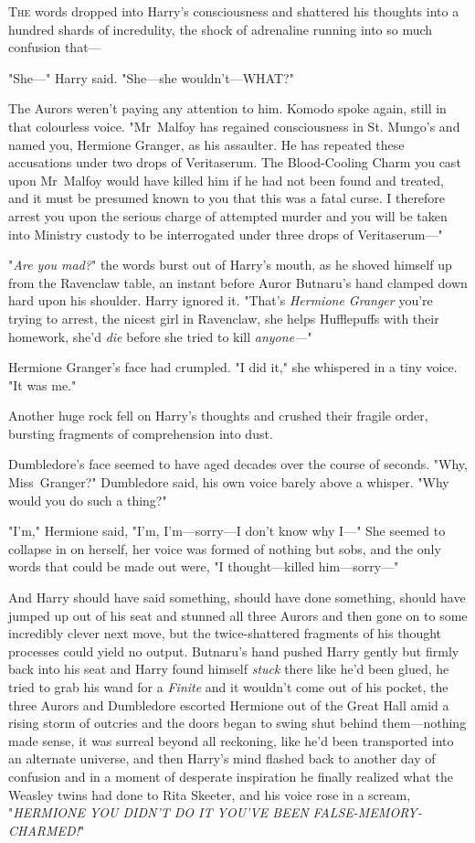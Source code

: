 
\lettrine{T}{he} words dropped into Harry's consciousness and shattered his thoughts into a
hundred shards of incredulity, the shock of adrenaline running into so much
confusion that—

"She—" Harry said. "She—she wouldn't—WHAT?"

The Aurors weren't paying any attention to him. Komodo spoke again, still in
that colourless voice. "Mr~Malfoy has regained consciousness in St. Mungo's and
named you, Hermione Granger, as his assaulter. He has repeated these
accusations under two drops of Veritaserum. The Blood-Cooling Charm you cast
upon Mr~Malfoy would have killed him if he had not been found and treated, and
it must be presumed known to you that this was a fatal curse. I therefore
arrest you upon the serious charge of attempted murder and you will be taken
into Ministry custody to be interrogated under three drops of Veritaserum—"

"\emph{Are you mad?}" the words burst out of Harry's mouth, as he shoved
himself up from the Ravenclaw table, an instant before Auror Butnaru's hand
clamped down hard upon his shoulder. Harry ignored it. "That's \emph{Hermione
Granger} you're trying to arrest, the nicest girl in Ravenclaw, she helps
Hufflepuffs with their homework, she'd \emph{die} before she tried to kill
\emph{anyone—}"

Hermione Granger's face had crumpled. "I did it," she whispered in a tiny
voice. "It was me."

Another huge rock fell on Harry's thoughts and crushed their fragile order,
bursting fragments of comprehension into dust.

Dumbledore's face seemed to have aged decades over the course of seconds. "Why,
Miss~Granger?" Dumbledore said, his own voice barely above a whisper. "Why
would you do such a thing?"

"I'm," Hermione said, "I'm, I'm—sorry—I don't know why I—" She seemed to
collapse in on herself, her voice was formed of nothing but sobs, and the only
words that could be made out were, "I thought—killed him—sorry—"

And Harry should have said something, should have done something, should have
jumped up out of his seat and stunned all three Aurors and then gone on to some
incredibly clever next move, but the twice-shattered fragments of his thought
processes could yield no output. Butnaru's hand pushed Harry gently but firmly
back into his seat and Harry found himself \emph{stuck} there like he'd been
glued, he tried to grab his wand for a \emph{Finite} and it wouldn't come out
of his pocket, the three Aurors and Dumbledore escorted Hermione out of the
Great Hall amid a rising storm of outcries and the doors began to swing shut
behind them—nothing made sense, it was surreal beyond all reckoning, like
he'd been transported into an alternate universe, and then Harry's mind flashed
back to another day of confusion and in a moment of desperate inspiration he
finally realized what the Weasley twins had done to Rita Skeeter, and his voice
rose in a scream, "\emph{HERMIONE YOU DIDN'T DO IT YOU'VE BEEN
FALSE-MEMORY-CHARMED!}"

